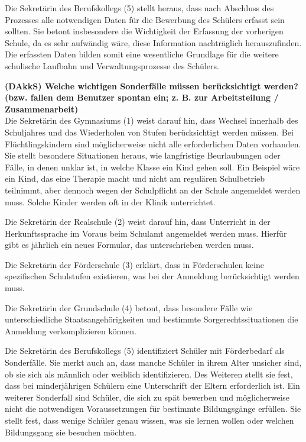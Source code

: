 Die Sekretärin des Berufskollegs (5) stellt heraus, dass nach Abschluss des Prozesses alle notwendigen Daten für die Bewerbung des Schülers erfasst sein sollten. Sie betont insbesondere die Wichtigkeit der Erfassung der vorherigen Schule, da es sehr aufwändig wäre, diese Information nachträglich herauszufinden. Die erfassten Daten bilden somit eine wesentliche Grundlage für die weitere schulische Laufbahn und Verwaltungsprozesse des Schülers.

\textbf{(DAkkS) Welche wichtigen Sonderfälle müssen berücksichtigt werden? (bzw. fallen dem Benutzer spontan ein; z. B. zur Arbeitsteilung / Zusammenarbeit)}\\
Die Sekretärin des Gymnasiums (1) weist darauf hin, dass Wechsel innerhalb des Schuljahres und das Wiederholen von Stufen berücksichtigt werden müssen. Bei Flüchtlingskindern sind möglicherweise nicht alle erforderlichen Daten vorhanden. Sie stellt besondere Situationen heraus, wie langfristige Beurlaubungen oder Fälle, in denen unklar ist, in welche Klasse ein Kind gehen soll. Ein Beispiel wäre ein Kind, das eine Therapie macht und nicht am regulären Schulbetrieb teilnimmt, aber dennoch wegen der Schulpflicht an der Schule angemeldet werden muss. Solche Kinder werden oft in der Klinik unterrichtet.

Die Sekretärin der Realschule (2) weist darauf hin, dass Unterricht in der Herkunftssprache im Voraus beim Schulamt angemeldet werden muss. Hierfür gibt es jährlich ein neues Formular, das unterschrieben werden muss.

Die Sekretärin der Förderschule (3) erklärt, dass in Förderschulen keine spezifischen Schulstufen existieren, was bei der Anmeldung berücksichtigt werden muss.

Die Sekretärin der Grundschule (4) betont, dass besondere Fälle wie unterschiedliche Staatsangehörigkeiten und bestimmte Sorgerechtssituationen die Anmeldung verkomplizieren können.

Die Sekretärin des Berufskollegs (5) identifiziert Schüler mit Förderbedarf als Sonderfälle. Sie merkt auch an, dass manche Schüler in ihrem Alter unsicher sind, ob sie sich als männlich oder weiblich identifizieren. Des Weiteren stellt sie fest, dass bei minderjährigen Schülern eine Unterschrift der Eltern erforderlich ist. Ein weiterer Sonderfall sind Schüler, die sich zu spät bewerben und möglicherweise nicht die notwendigen Voraussetzungen für bestimmte Bildungsgänge erfüllen. Sie stellt fest, dass wenige Schüler genau wissen, was sie lernen wollen oder welchen Bildungsgang sie besuchen möchten.


